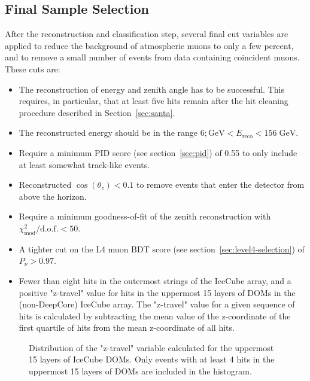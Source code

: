 \subsection{Final Sample Selection}

After the reconstruction and classification step, several final cut variables are applied to reduce the background of atmospheric muons to only a few percent, and to remove a small number of events from data containing coincident muons. These cuts are:
\begin{itemize}
    \item The reconstruction of energy and zenith angle has to be successful. This requires, in particular, that at least five hits remain after the hit cleaning procedure described in Section~\ref{sec:santa}.
    \item The reconstructed energy should be in the range $6;\mathrm{GeV} < E_{\mathrm{reco}} < 156\;\mathrm{GeV}$.
    \item Require a minimum PID score (see section~\ref{sec:pid}) of 0.55 to only include at least somewhat track-like events.
    \item Reconstructed $\cos(\theta_z) < 0.1$ to remove events that enter the detector from above the horizon.
    \item Require a minimum goodness-of-fit of the zenith reconstruction with $\chi^2_{\mathrm{mod}}/\mathrm{d.o.f.} < 50$.
    \item A tighter cut on the L4 muon BDT score (see section~\ref{sec:level4-selection}) of $P_\nu > 0.97$.
    \item Fewer than eight hits in the outermost strings of the IceCube array, and a positive "z-travel" value for hits in the uppermost 15 layers of DOMs in the (non-DeepCore) IceCube array. The "z-travel" value for a given sequence of hits is calculated by subtracting the mean value of the z-coordinate of the first quartile of hits from the mean z-coordinate of all hits. 
\end{itemize}

\begin{figure}
    \centering
    
    \caption{Distribution of the "z-travel" variable calculated for the uppermost 15 layers of IceCube DOMs. Only events with at least 4 hits in the uppermost 15 layers of DOMs are included in the histogram.}
    \label{fig:z_travel_distribution}
\end{figure}

%     


